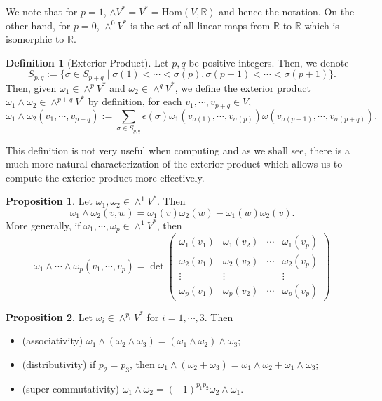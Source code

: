 \documentclass[]{article}
\theoremstyle{definition}
\theoremstyle{definition}
\newtheorem{definition}{Definition}[section]
\newtheorem{proposition}{Proposition}[section]
\begin{document}
We note that for \(p = 1\), \(\wedge V^* = V^* = \text{Hom}(V, \mathbb{R})\) 
and hence the notation. On the other hand, for \(p = 0\), \(\wedge^0 V^*\) 
is the set of all linear maps from \(\mathbb{R}\) to \(\mathbb{R}\) which is 
isomorphic to \(\mathbb{R}\).

\begin{definition}[Exterior Product]
  Let \(p, q\) be positive integers. Then, we denote 
  \[S_{p, q} := \{\sigma \in S_{p + q} \mid \sigma(1) < \cdots < \sigma(p), 
    \sigma(p + 1) < \cdots < \sigma(p + 1)\}.\]
  Then, given \(\omega_1 \in \wedge^p V^*\) and \(\omega_2 \in \wedge^q V^*\),
  we define the exterior product \(\omega_1 \wedge \omega_2 \in \wedge^{p + q} V^*\) 
  by definition, for each \(v_1, \cdots, v_{p + q} \in V\), 
  \[\omega_1 \wedge \omega_2(v_1, \cdots, v_{p + q}) := 
    \sum_{\sigma \in S_{p, q}} \epsilon(\sigma) \omega_1(v_{\sigma(1)}, \cdots, v_{\sigma(p)}) 
    \omega(v_{\sigma(p + 1)}, \cdots, v_{\sigma(p + q)}).\]
\end{definition}

This definition is not very useful when computing and as we shall see, there 
is a much more natural characterization of the exterior product which allows us 
to compute the exterior product more effectively.

\begin{proposition}
  Let \(\omega_1, \omega_2 \in \wedge^1 V^*\). Then 
  \[\omega_1 \wedge \omega_2(v, w) = \omega_1(v)\omega_2(w) - \omega_1(w)\omega_2(v).\]
  More generally, if \(\omega_1, \cdots, \omega_p \in \wedge^1 V^*\), then 
  \[\omega_1 \wedge \cdots \wedge \omega_p(v_1, \cdots, v_p) = 
  \det\begin{pmatrix}
    \omega_1(v_1) & \omega_1(v_2) & \cdots & \omega_1(v_p) \\
    \omega_2(v_1) & \omega_2(v_2) & \cdots & \omega_2(v_p) \\
    \vdots & \vdots &  & \vdots \\
    \omega_p(v_1) & \omega_p(v_2) & \cdots & \omega_p(v_p)
  \end{pmatrix}\]
\end{proposition}

\begin{proposition}
  Let \(\omega_i \in \wedge^{p_i} V^*\) for \(i = 1, \cdots, 3\). Then 
  \begin{itemize}
    \item (associativity) \(\omega_1 \wedge (\omega_2 \wedge \omega_3) = 
      (\omega_1 \wedge \omega_2) \wedge \omega_3\);
    \item (distributivity) if \(p_2 = p_3\), then 
      \(\omega_1 \wedge (\omega_2 + \omega_3) = 
      \omega_1 \wedge \omega_2 + \omega_1 \wedge \omega_3\);
    \item (super-commutativity) \(\omega_1 \wedge \omega_2 = 
      (-1)^{p_1p_2} \omega_2 \wedge \omega_1\).
  \end{itemize}
\end{proposition}
\end{document}
